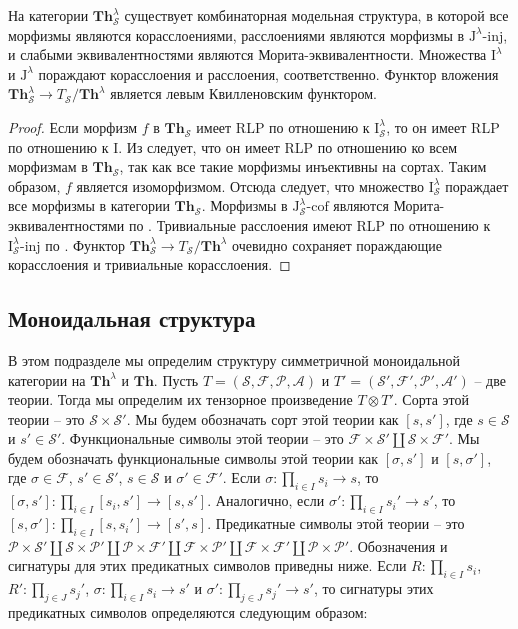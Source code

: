 \documentclass[reqno]{amsart}
\theoremstyle{definition}
\theoremstyle{remark}
\newcommand{\bcat}[1]{\mathbf{#1}}
\newcommand{\Th}{\bcat{Th}}
\newcommand{\I}{\mathrm{I}}
\newcommand{\J}{\mathrm{J}}
\newcommand{\class}[2]{#1\text{-}\mathrm{#2}}
\newcommand{\Iinj}[1][\I]{\class{#1}{inj}}
\newcommand{\Icof}[1][\I]{\class{#1}{cof}}
\begin{document}
\begin{prop}
На категории $\Th^\lambda_\mathcal{S}$ существует комбинаторная модельная структура, в которой все морфизмы являются корасслоениями, расслоениями являются морфизмы в $\Iinj[\J^\lambda]$, и слабыми эквивалентностями являются Морита-эквивалентности.
Множества $\I^\lambda$ и $\J^\lambda$ пораждают корасслоения и расслоения, соответственно.
Функтор вложения $\Th^\lambda_\mathcal{S} \to T_\mathcal{S}/\Th^\lambda$ является левым Квилленовским функтором.
\end{prop}
\begin{proof}
Если морфизм $f$ в $\Th_\mathcal{S}$ имеет RLP по отношению к $\I^\lambda_\mathcal{S}$, то он имеет RLP по отношению к $\I$.
Из  следует, что он имеет RLP по отношению ко всем морфизмам в $\Th_\mathcal{S}$, так как все такие морфизмы инъективны на сортах.
Таким образом, $f$ является изоморфизмом.
Отсюда следует, что множество $\I^\lambda_\mathcal{S}$ пораждает все морфизмы в категории $\Th_\mathcal{S}$.
Морфизмы в $\Icof[\J_\mathcal{S}^\lambda]$ являются Морита-эквивалентностями по .
Тривиальные расслоения имеют RLP по отношению к $\Iinj[\I_\mathcal{S}^\lambda]$ по .
Функтор $\Th^\lambda_\mathcal{S} \to T_\mathcal{S}/\Th^\lambda$ очевидно сохраняет пораждающие корасслоения и тривиальные корасслоения.
\end{proof}

\subsection{Моноидальная структура}

В этом подразделе мы определим структуру симметричной моноидальной категории на $\Th^\lambda$ и $\Th$.
Пусть $T = (\mathcal{S},\mathcal{F},\mathcal{P},\mathcal{A})$ и $T' = (\mathcal{S}',\mathcal{F}',\mathcal{P}',\mathcal{A}')$ -- две теории.
Тогда мы определим их тензорное произведение $T \otimes T'$.
Сорта этой теории -- это $\mathcal{S} \times \mathcal{S}'$.
Мы будем обозначать сорт этой теории как $[s,s']$, где $s \in \mathcal{S}$ и $s' \in \mathcal{S}'$.
Функциональные символы этой теории -- это $\mathcal{F} \times \mathcal{S}' \amalg \mathcal{S} \times \mathcal{F'}$.
Мы будем обозначать функциональные символы этой теории как $[\sigma,s']$ и $[s,\sigma']$, где $\sigma \in \mathcal{F}$, $s' \in \mathcal{S}'$, $s \in \mathcal{S}$ и $\sigma' \in \mathcal{F}'$.
Если $\sigma : \prod_{i \in I} s_i \to s$, то $[\sigma,s'] : \prod_{i \in I} [s_i,s'] \to [s,s']$.
Аналогично, если $\sigma' : \prod_{i \in I} s_i' \to s'$, то $[s,\sigma'] : \prod_{i \in I} [s,s_i'] \to [s',s]$.
Предикатные символы этой теории -- это $\mathcal{P} \times \mathcal{S}' \amalg \mathcal{S} \times \mathcal{P}' \amalg \mathcal{P} \times \mathcal{F}' \amalg \mathcal{F} \times \mathcal{P}' \amalg \mathcal{F} \times \mathcal{F}' \amalg \mathcal{P} \times \mathcal{P}'$.
Обозначения и сигнатуры для этих предикатных символов приведны ниже.
Если $R : \prod_{i \in I} s_i$, $R' : \prod_{j \in J} s_j'$, $\sigma : \prod_{i \in I} s_i \to s'$ и $\sigma' : \prod_{j \in J} s_j' \to s'$, то сигнатуры этих предикатных символов определяются следующим образом:
\end{document}
